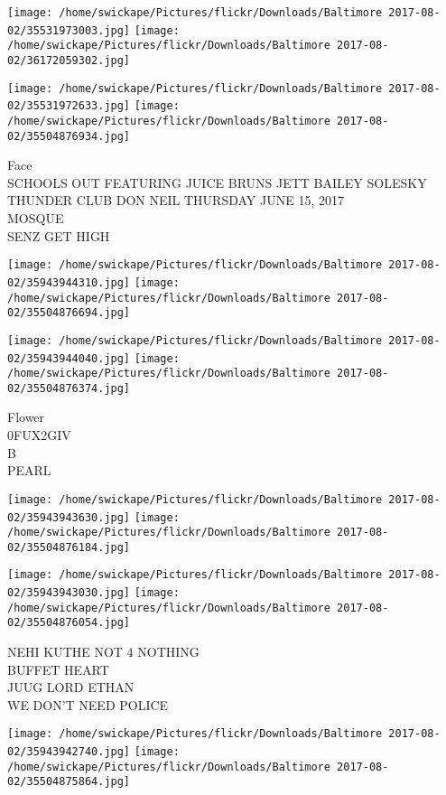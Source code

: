 \documentclass[10pt,letterpaper]{article}
\begin{document}
\texttt{[image: /home/swickape/Pictures/flickr/Downloads/Baltimore 2017-08-02/35531973003.jpg]}
\texttt{[image: /home/swickape/Pictures/flickr/Downloads/Baltimore 2017-08-02/36172059302.jpg]}

\texttt{[image: /home/swickape/Pictures/flickr/Downloads/Baltimore 2017-08-02/35531972633.jpg]}
\texttt{[image: /home/swickape/Pictures/flickr/Downloads/Baltimore 2017-08-02/35504876934.jpg]}

Face\\
SCHOOLS OUT FEATURING JUICE BRUNS JETT BAILEY SOLESKY THUNDER CLUB DON NEIL THURSDAY JUNE 15, 2017\\
MOSQUE\\
SENZ GET HIGH\\
\pagebreak

\texttt{[image: /home/swickape/Pictures/flickr/Downloads/Baltimore 2017-08-02/35943944310.jpg]}
\texttt{[image: /home/swickape/Pictures/flickr/Downloads/Baltimore 2017-08-02/35504876694.jpg]}

\texttt{[image: /home/swickape/Pictures/flickr/Downloads/Baltimore 2017-08-02/35943944040.jpg]}
\texttt{[image: /home/swickape/Pictures/flickr/Downloads/Baltimore 2017-08-02/35504876374.jpg]}

Flower\\
0FUX2GIV\\
B\\
PEARL\\
\pagebreak

\texttt{[image: /home/swickape/Pictures/flickr/Downloads/Baltimore 2017-08-02/35943943630.jpg]}
\texttt{[image: /home/swickape/Pictures/flickr/Downloads/Baltimore 2017-08-02/35504876184.jpg]}

\texttt{[image: /home/swickape/Pictures/flickr/Downloads/Baltimore 2017-08-02/35943943030.jpg]}
\texttt{[image: /home/swickape/Pictures/flickr/Downloads/Baltimore 2017-08-02/35504876054.jpg]}

NEHI KUTHE NOT 4 NOTHING\\
BUFFET HEART\\
JUUG LORD ETHAN\\
WE DON'T NEED POLICE\\
\pagebreak

\texttt{[image: /home/swickape/Pictures/flickr/Downloads/Baltimore 2017-08-02/35943942740.jpg]}
\texttt{[image: /home/swickape/Pictures/flickr/Downloads/Baltimore 2017-08-02/35504875864.jpg]}
\end{document}
